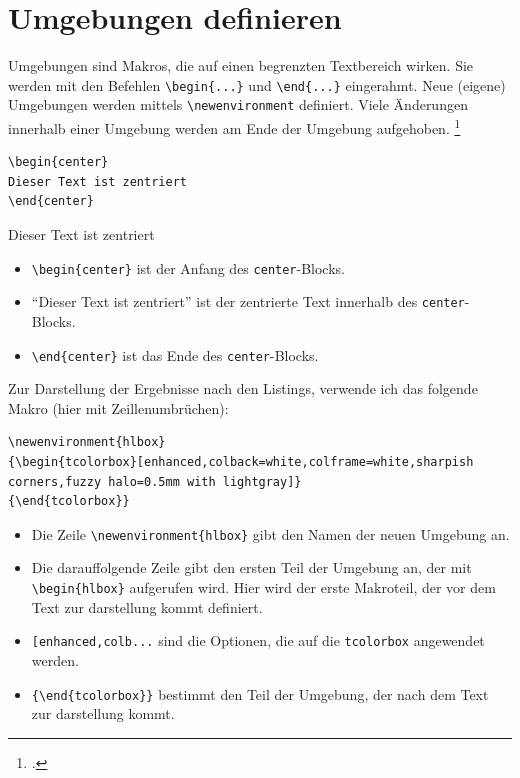 \documentclass[ngerman,12pt,titlepage]{scrartcl}
\newenvironment{hlbox}{\begin{tcolorbox}[enhanced,colback=white,colframe=white,sharpish corners,fuzzy halo=0.5mm with lightgray]}{\end{tcolorbox}}
\begin{document}
\section{Umgebungen definieren}
\label{sec:UmgDef}
Umgebungen sind Makros, die auf einen begrenzten Textbereich wirken. Sie werden mit den Befehlen \lstinline|\begin{...}| und \lstinline|\end{...}| eingerahmt. Neue (eigene) Umgebungen werden mittels \lstinline|\newenvironment| definiert. Viele Änderungen innerhalb einer Umgebung werden am Ende der Umgebung aufgehoben. \footcite{wiki:environment} \\
\begin{lstlisting}[caption = zentrierter Text]
\begin{center}
Dieser Text ist zentriert
\end{center}
\end{lstlisting}
\begin{hlbox}
\begin{center}
Dieser Text ist zentriert
\end{center}
\end{hlbox}
\begin{itemize}
\item[] \lstinline|\begin{center}| ist der Anfang des \texttt{center}-Blocks. 
\item[] \enquote{Dieser Text ist zentriert} ist der zentrierte Text innerhalb des \texttt{center}-Blocks.
\item[] \lstinline|\end{center}| ist das Ende des \texttt{center}-Blocks. 
\end{itemize}
Zur Darstellung der Ergebnisse nach den Listings, verwende ich das folgende Makro (hier mit Zeillenumbrüchen):
\begin{lstlisting}[caption = Highlightbox]
\newenvironment{hlbox}
{\begin{tcolorbox}[enhanced,colback=white,colframe=white,sharpish corners,fuzzy halo=0.5mm with lightgray]}
{\end{tcolorbox}}
\end{lstlisting}
\begin{itemize}
\item[] Die Zeile \lstinline|\newenvironment{hlbox}| gibt den Namen der neuen Umgebung an. 
\item[] Die darauffolgende Zeile gibt den ersten Teil der Umgebung an, der mit \lstinline|\begin{hlbox}| aufgerufen wird. Hier wird der erste Makroteil, der vor dem Text zur darstellung kommt definiert.
\item[] \lstinline|[enhanced,colb...| sind die Optionen, die auf die \texttt{tcolorbox} angewendet werden.
\item[] \lstinline|{\end{tcolorbox}}| bestimmt den Teil der Umgebung, der nach dem Text zur darstellung kommt.
\end{itemize}
\end{document}
